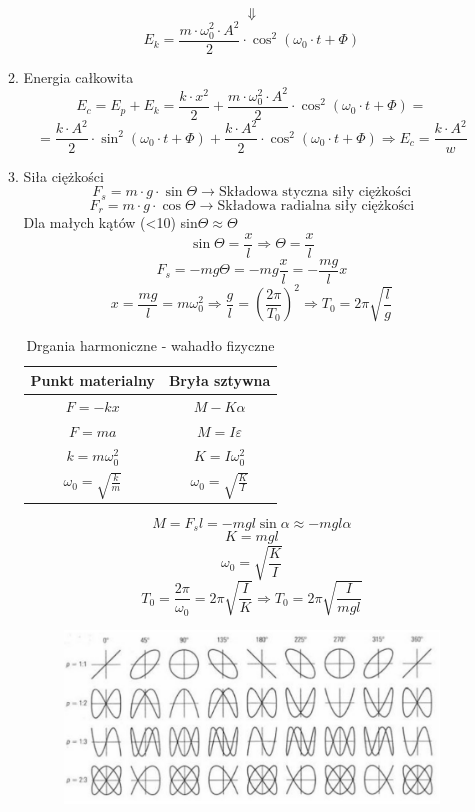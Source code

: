 \documentclass{article}
\begin{document}
\begin{enumerate}
\begin{enumerate}
\[			\]
			\[
			\Downarrow
			\]
			\[
			E_k = \frac{m \cdot \omega_0^2 \cdot A^2}{2} \cdot \cos^2(\omega_0 \cdot t + \varPhi)
			\]
			\item Energia całkowita
			\[
			E_c = E_p + E_k = \frac{k \cdot x^2}{2} + \frac{m \cdot \omega_0^2 \cdot A^2}{2} \cdot \cos^2(\omega_0 \cdot t + \varPhi) =
			\]
			\[
			= \frac{k \cdot A^2}{2} \cdot \sin^2(\omega_0 \cdot t + \varPhi) + \frac{k \cdot A^2}{2} \cdot \cos^2(\omega_0 \cdot t + \varPhi) \Rightarrow E_c = \frac{k \cdot A^2}{w}
			\]
			\item Siła ciężkości
			\[
			F_s = m \cdot g \cdot \sin \varTheta \longrightarrow \text{Składowa styczna siły ciężkości}
			\]
			\[
			F_r = m \cdot g \cdot \cos \varTheta \longrightarrow \text{Składowa radialna siły ciężkości}
			\]
			Dla małych kątów (<10\textdegree) sin$\Theta \approx \Theta$
			\[
			\sin \varTheta = \frac{x}{l} \Longrightarrow \varTheta = \frac{x}{l}
			\]
			\[
			F_s = -mg\varTheta = -mg \frac{x}{l} = - \frac{mg}{l}x
			\]
			\[
			x = \frac{mg}{l} = m \omega_0^2 \Rightarrow \frac{g}{l} = \left( \frac{2 \pi}{T_0} \right)^2 \Rightarrow T_0 = 2 \pi \sqrt{\frac{l}{g}}
			\]
			\renewcommand{\arraystretch}{1.5}
			\begin{table}[h]
				\centering
				\caption{Drgania harmoniczne - wahadło fizyczne}
				\label{tab:Drgania harmoniczne - wahadło fizyczne}
				\begin{tabular}{|c|c|}
					\hline
					\textbf{Punkt materialny} & \textbf{Bryła sztywna} \\
					\hline
					$F = -kx$ & $M -K\alpha$  \\
					\hline
					$F = ma$ & $M = I \varepsilon$ \\
					\hline
					$k = m \omega_0^2$ & $K = I \omega_0^2$ \\
					\hline
					$\omega_0 = \sqrt{\frac{k}{m}}$ & $\omega_0 = \sqrt{\frac{K}{I}}$ \\
					\hline
				\end{tabular}
			\end{table}
			\[
			M = F_sl = -mgl \sin \alpha \approx -mgl \alpha
			\]
			\[
			K = mgl
			\]
			\[
			\omega_0 = \sqrt{\frac{K}{I}}
			\]
			\[
			T_0 = \frac{2 \pi}{\omega_0} = 2 \pi \sqrt{\frac{I}{K}} \Rightarrow T_0 = 2 \pi \sqrt{\frac{I}{mgl}}
			\]
			\begin{figure}[h]
				\centering
				\includegraphics[width=1\textwidth]{krzywe_Lissajous.png}

\end{figure}
\end{enumerate}
\end{enumerate}
\end{document}
